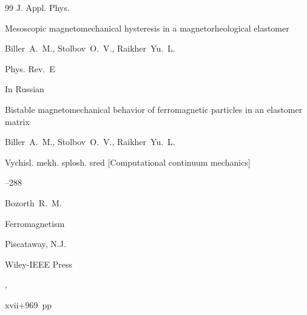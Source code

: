 \begin{thebibliography}{99}
\jour J. Appl. Phys.





 \nofrills





\paper Mesoscopic magnetomechanical hysteresis in a magnetorheological elastomer

\by Biller~A.~M., Stolbov~O.~V., Raikher~Yu.~L.

\jour Phys. Rev.~E





 \nofrills





\lang In Russian

\paper Bistable magnetomechanical behavior of ferromagnetic particles in an elastomer matrix 

\by Biller~A.~M., Stolbov~O.~V., Raikher~Yu.~L.

\jour Vychisl. mekh. splosh. sred \rm [Computational continuum mechanics]




--288





\by Bozorth~R.~M.

\book Ferromagnetism

\publaddr  Piscataway, N.J.

\publ Wiley-IEEE Press

,


xvii+969~pp






\end{thebibliography}
